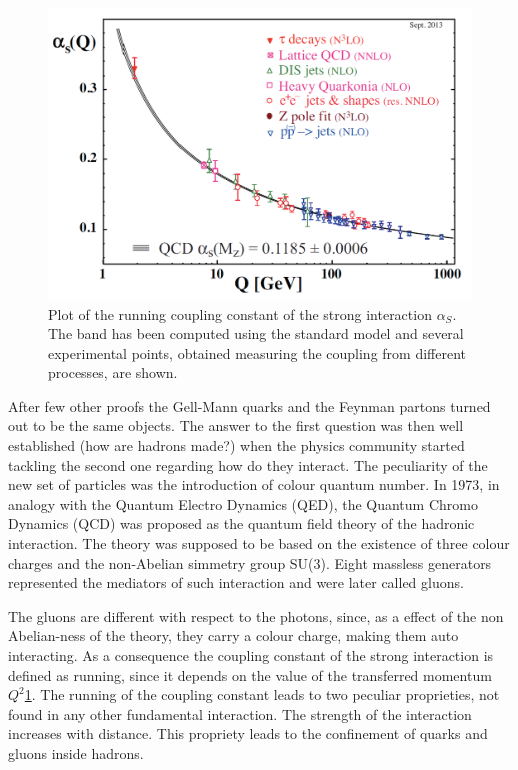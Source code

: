 \begin{figure}[!t]
\begin{center}
\includegraphics[width=0.85\linewidth]{Chapters/Introduction/Figs/QCD-running-coupling.png}
\caption{Plot of the running coupling constant of the strong interaction $\alpha_S$. The band has been computed using the standard model and several experimental points, obtained measuring the coupling from different processes, are shown.}
\label{fig:running}
\end{center}
\end{figure}

After few other proofs the Gell-Mann quarks and the Feynman partons turned out to be the same objects.
The answer to the first question was then well established (how are hadrons made?) when the physics community started tackling the second one regarding how do they interact.
The peculiarity of the new set of particles was the introduction of colour quantum number.
In 1973, in analogy with the Quantum Electro Dynamics (QED), the Quantum Chromo Dynamics (QCD) was proposed as the quantum field theory of the hadronic interaction.
The theory was supposed to be based on the existence of three colour charges and the non-Abelian simmetry group SU(3).
Eight massless generators represented the mediators of such interaction and were later called gluons.

The gluons are different with respect to the photons, since, as a effect of the non Abelian-ness of the theory, they carry a colour charge, making them auto interacting.
As a consequence the coupling constant of the strong interaction is defined as running, since it depends on the value of the transferred momentum $Q^2$\ref{fig:running}.
The running of the coupling constant leads to two peculiar proprieties, not found in any other fundamental interaction.
The strength of the interaction increases with distance.
This propriety leads to the confinement of quarks and gluons inside hadrons.


